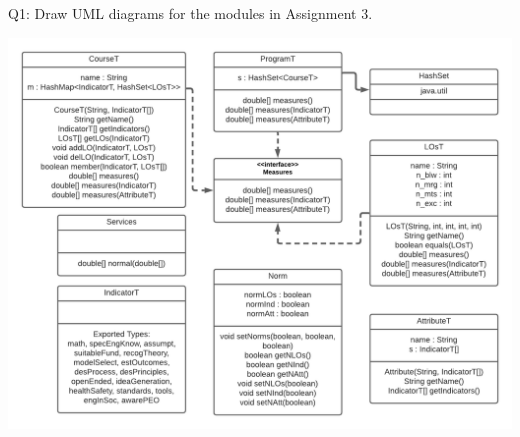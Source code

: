 \documentclass[12pt]{article}
\begin{document}
Q1: Draw UML diagrams for the modules in Assignment 3.

\bigskip

\includegraphics[width=1\textwidth]{Q1_UML_Diagram.png} \\
\end{document}
